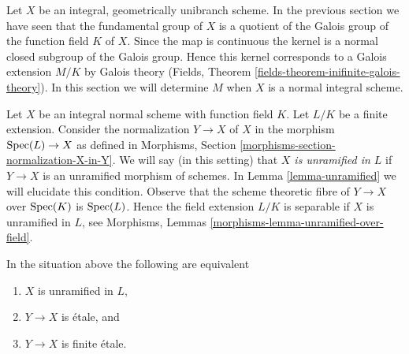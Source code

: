 \noindent
Let $X$ be an integral, geometrically unibranch scheme. In the previous section
we have seen that the fundamental group of $X$ is a quotient of the
Galois group of the function field $K$ of $X$. Since the map is continuous
the kernel is a normal closed subgroup of the Galois group. Hence this kernel
corresponds to a Galois extension $M/K$ by Galois theory
(Fields, Theorem \ref{fields-theorem-inifinite-galois-theory}).
In this section we will determine $M$ when $X$ is a normal integral scheme.

\medskip\noindent
Let $X$ be an integral normal scheme with function field $K$.
Let $L/K$ be a finite extension. Consider the normalization
$Y \to X$ of $X$ in the morphism $\mathop{\mathrm{Spec}}(L) \to X$ as defined in
Morphisms, Section \ref{morphisms-section-normalization-X-in-Y}.
We will say (in this setting) that {\it $X$ is unramified in $L$}
if $Y \to X$ is an unramified morphism of schemes. In
Lemma \ref{lemma-unramified} we will elucidate this condition.
Observe that the scheme theoretic fibre of $Y \to X$ over $\mathop{\mathrm{Spec}}(K)$
is $\mathop{\mathrm{Spec}}(L)$. Hence the field extension $L/K$ is separable if $X$ is
unramified in $L$, see
Morphisms, Lemmas \ref{morphisms-lemma-unramified-over-field}.

\begin{lemma}
\label{lemma-unramified-in-L}
In the situation above the following are equivalent
\begin{enumerate}
\item $X$ is unramified in $L$,
\item $Y \to X$ is \'etale, and
\item $Y \to X$ is finite \'etale.
\end{enumerate}
\end{lemma}


